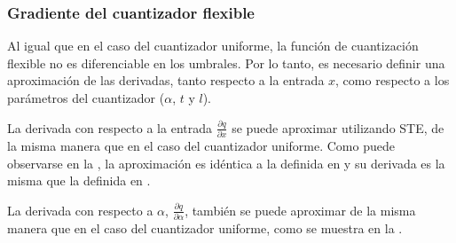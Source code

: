 




\subsubsection{Gradiente del cuantizador flexible}

Al igual que en el caso del cuantizador uniforme, la función de cuantización flexible no es diferenciable en los umbrales. Por lo tanto, es necesario definir una aproximación de las derivadas, tanto respecto a la entrada $x$, como respecto a los parámetros del cuantizador ($\alpha$, $t$ y $l$).

La derivada con respecto a la entrada $\frac{\partial q}{\partial x}$ se puede aproximar utilizando STE, de la misma manera que en el caso del cuantizador uniforme. Como puede observarse en la , la aproximación es idéntica a la definida en  y su derivada es la misma que la definida en .


La derivada con respecto a $\alpha$, $\frac{\partial q}{\partial \alpha}$, también se puede aproximar de la misma manera que en el caso del cuantizador uniforme, como se muestra en la .



